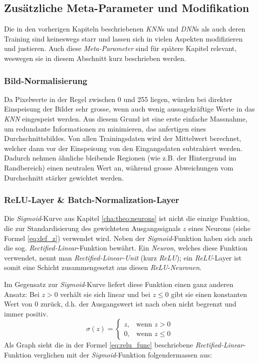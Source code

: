 \subsection{Zusätzliche Meta-Parameter und Modifikation}\label{cha:theo:mod}
Die in den vorherigen Kapiteln beschriebenen \textit{KNN}s und \textit{DNN}s als auch deren Training sind keineswegs starr und lassen sich in vielen Aspekten modifizieren und justieren. Auch diese \textit{Meta-Parameter} sind für spätere Kapitel relevant, weswegen sie in diesem Abschnitt kurz beschrieben werden. 

\subsubsection{Bild-Normalisierung}\label{cha:theo:mod:imgnor}
Da Pixelwerte in der Regel zwischen 0 und 255 liegen, würden bei direkter Einspeisung der Bilder sehr grosse, wenn auch wenig aussagekräftige Werte in das \textit{KNN} eingespeist werden. Aus diesem Grund ist eine erste einfache Massnahme, um redundante Informationen zu minimieren, das anfertigen eines Durchschnittsbildes. Von allen Trainingsdaten wird der Mittelwert berechnet, welcher dann vor der Einspeisung von den Eingangsdaten subtrahiert werden. Dadurch nehmen ähnliche bleibende Regionen (wie z.B. der Hintergrund im Randbereich) einen neutralen Wert an, während grosse Abweichungen vom Durchschnitt stärker gewichtet werden\cite{zerocenter}.

\subsubsection{ReLU-Layer \& Batch-Normalization-Layer}\label{cha:theo:relu}
Die \textit{Sigmoid}-Kurve aus Kapitel \ref{cha:theo:neurons} ist nicht die einzige Funktion, die zur Standardisierung des gewichteten Ausgangssignals $z$ eines Neurons (siehe Formel \ref{eq:def_z}) verwendet wird. Neben der \textit{Sigmoid}-Funktion haben sich auch die sog. \textit{Rectified-Linear}-Funktion bewährt. Ein \textit{Neuron}, welches diese Funktion verwendet, nennt man \textit{Rectified-Linear-Unit} (kurz \textit{ReLU}); ein \textit{ReLU}-Layer ist somit eine Schicht zusammengesetzt aus diesen \textit{ReLU}-\textit{Neuronen}.

Im Gegensatz zur \textit{Sigmoid}-Kurve liefert diese Funktion einen ganz anderen Ansatz: Bei $z > 0$ verhält sie sich linear und bei $z \leq 0$ gibt sie einen konstanten Wert von 0 zurück, d.h. der Ausgangswert ist nach oben nicht begrenzt und immer positiv.
\begin{equation}\label{eq:relu_func}
	\sigma(z) = \begin{cases} z, & \mbox{wenn } z > 0 \\ 0, & \mbox{wenn } z \leq 0 \end{cases}
\end{equation}
Als Graph sieht die in der Formel \ref{eq:relu_func} beschriebene \textit{Rectified-Linear}-Funktion verglichen mit der \textit{Sigmoid}-Funktion folgendermassen aus:

